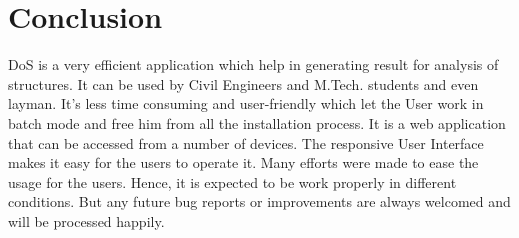 \section{Conclusion}
DoS is a very efficient application which help in generating result for analysis of structures. It
can be used by Civil Engineers and M.Tech. students and even layman. It's less time consuming and user-friendly which let the User work in batch mode 
and free him from all the installation process. It is a web application that can be accessed from a number of devices. The responsive User Interface makes it easy for the users to operate it. Many efforts were made to ease the usage for the users. Hence, it is expected to be work properly in different conditions. But any future bug reports or improvements are always welcomed and will be processed happily.
